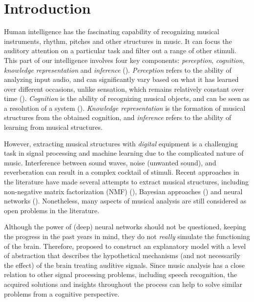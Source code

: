 

\setcounter{chapter}{-1}
\chapter{Introduction}
\label{ch:introduction}


Human intelligence has the fascinating capability of recognizing musical instruments, rhythm, pitches and other structures in music. It can focus the auditory attention on a particular task and filter out a range of other stimuli. This part of our intelligence involves four key components: \textit{perception}, \textit{cognition}, \textit{knowledge representation} and \textit{inference} (\cite{benetos_automatic_2019}).
\textit{Perception} refers to the ability of analyzing input audio, and can significantly vary based on what it has learned over different occasions, unlike sensation, which remains relatively constant over time (\cite{obrien_epistemology_nodate}). \textit{Cognition} is the ability of recognizing musical objects, and can be seen as a resolution of a system (\cite{oppenheim_human_2013}). \textit{Knowledge representation} is the formation of musical structures from the obtained cognition, and \textit{inference} refers to the ability of learning from musical structures.


However, extracting musical structures with \textit{digital} equipment is a challenging task in signal processing and machine learning due to the complicated nature of music. Interference between sound waves, noise (unwanted sound), and reverberation can result in a complex cocktail of stimuli. Recent approaches in the literature have made several attempts to extract musical structures, including non-negative matrix factorization (NMF) (\cite{lopez-serrano_nmf_2019, holzapfel_musical_2008}), Bayesian approaches (\cite{donnelly_bayesian_2012, temperley_bayesian_2004}) and neural networks (\cite{draguns_residual_2021, sleep_automatic_2017}). Nonetheless, many aspects of musical analysis are still considered as open problems in the literature.


Although the power of (deep) neural networks should not be questioned, keeping the progress in the past years in mind, they do not \textit{really} simulate the functioning of the brain. Therefore, \textcite{wiggins_creativity_2020} proposed to construct an explanatory model with a level of abstraction that describes the hypothetical mechanisms (and not necessarily the effect) of the brain treating auditive signals. Since music analysis has a close relation to other signal processing problems, including speech recognition, the acquired solutions and insights throughout the process can help to solve similar problems from a cognitive perspective.


